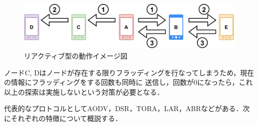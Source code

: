 \documentclass[a4paper, 11pt]{ltjsarticle}
\begin{document}
\begin{figure}[H]
  \centering
  \includegraphics[width=130mm]{reactive_model.pdf}
  \caption{リアクティブ型の動作イメージ図}
  \label{reactive}
\end{figure}

ノードC, Dはノードが存在する限りフラッディングを行なってしまうため，現在の情報にフラッディングをする回数も同時に
送信し，回数が0になったら，これ以上の探索は実施しないという対策が必要となる．

代表的なプロトコルとしてAODV，DSR，TORA，LAR，ABRなどがある．次にそれぞれの特徴について概説する．
\end{document}
